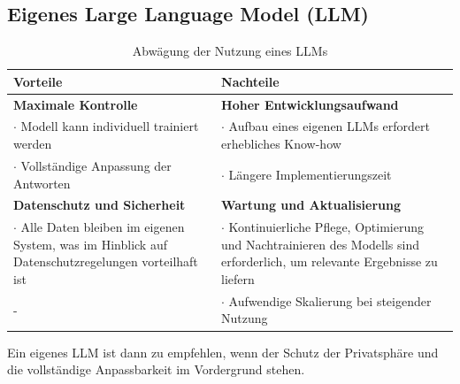 \documentclass[%
	12pt,
	a4paper,
	oneside,
	parskip=full
]{scrbook}
\begin{document}
\subsection{Eigenes Large Language Model (LLM)}
\begin{table}[ht]
	\centering
	\begin{tabularx}{\textwidth}{X|X}
		Vorteile & Nachteile \\ \hline \hline
		\textbf{Maximale Kontrolle} & \textbf{Hoher Entwicklungsaufwand} \\
		$\cdot$ Modell kann individuell trainiert werden & $\cdot$ Aufbau eines eigenen LLMs erfordert erhebliches Know-how\\
		$\cdot$ Vollständige Anpassung der Antworten & $\cdot$ Längere Implementierungszeit\\ \hline
		\textbf{Datenschutz und Sicherheit} & \textbf{Wartung und Aktualisierung} \\
		$\cdot$ Alle Daten bleiben im eigenen System, was im Hinblick auf Datenschutzregelungen vorteilhaft ist & $\cdot$ Kontinuierliche Pflege, Optimierung und Nachtrainieren des Modells sind erforderlich, um relevante Ergebnisse zu liefern \\
		- & $\cdot$ Aufwendige Skalierung bei steigender Nutzung \\
	\end{tabularx}
	\caption{Abwägung der Nutzung eines LLMs}
\end{table}
Ein eigenes LLM ist dann zu empfehlen, wenn der Schutz der Privatsphäre und die vollständige Anpassbarkeit im Vordergrund stehen.
\end{document}
